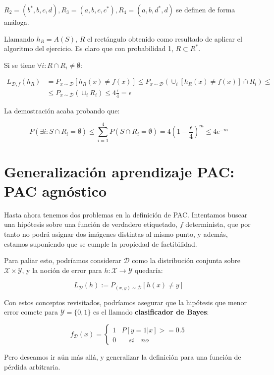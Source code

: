 \documentclass[11pt]{article}
\begin{document}
$R_2=(b^{\ast},b,c,d), R_3=(a,b,c,c^{\ast}), R_4=(a,b,d^{\ast},d)$ se definen de forma análoga.


Llamando $h_R=A(S)$, $R$ el rectángulo obtenido como resultado de aplicar el algoritmo del ejercicio. Es claro que con probabilidad 1, $R\subset R^{\ast}$. 

Si se tiene $\forall i : R\cap R_i \neq \emptyset$:

\begin{align*}
L_{\mathcal{D},f}(h_R) &= P_{x\sim \mathcal{D}}[h_R(x)\neq f(x)] \le P_{x\sim \mathcal{D}}\left(\cup_i [h_R(x)\neq f(x)]\cap R_i\right) \le\\
&\le P_{x\sim \mathcal{D}}\left(\cup_i R_i\right) \le 4\frac{\epsilon}{4} = \epsilon
\end{align*}


La demostración acaba probando que:

\[P(\exists i : S\cap R_i = \emptyset) \le \sum_{i=1}^4 P(S\cap R_i = \emptyset) = 4(1-\frac{\epsilon}{4})^m \le 4e^{-m}\]

\section{Generalización aprendizaje PAC: PAC agnóstico}
\label{sec-3}
Hasta ahora tenemos dos problemas en la definición de PAC. Intentamos buscar una hipótesis sobre una función de verdadero etiquetado, $f$ determinista, que por tanto no podrá asignar dos imágenes distintas al mismo punto, y además, estamos suponiendo que se cumple la propiedad de factibilidad.

Para paliar esto, podríamos considerar $\mathcal{D}$ como la distribución conjunta sobre $\mathcal{X} \times \mathcal{Y}$, y la noción de error para $h: \mathcal{X} \rightarrow \mathcal{Y}$ quedaría:

\[L_{\mathcal{D}}(h):= P_{(x,y) \sim \mathcal{D}} [h(x) \neq y]\]

Con estos conceptos revisitados, podríamos asegurar que la hipótesis que menor error comete para $\mathcal{Y} = \{0,1\}$ es el llamado \textbf{clasificador de Bayes}:

\[f_{\mathcal{D}}(x) = \left\{\begin{array}{ll}
1 & P [y = 1 |x] >= 0.5\\
0 & \quad si \quad no
\end{array}\right.\]

Pero deseamos ir aún más allá, y generalizar la definición para una función de pérdida arbitraria.
\end{document}
